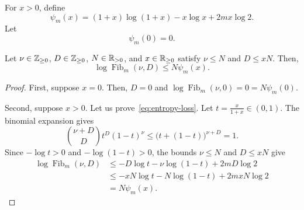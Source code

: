 \begin{definition}\label{def:entropy-loss-function}
For $x>0$, define
\[
 \psi_m(x)=(1+x)\log(1+x)-x\log x+2mx\log2.
\]
Let
\[
 \psi_m(0)=0.
\]
\end{definition}

\begin{lemma}\label{lem:entropy-loss}
Let $\nu\in\mathbb Z_{\ge0}$, $D\in\mathbb Z_{\ge0}$, $N\in\mathbb R_{>0}$, and $x\in\mathbb R_{\ge0}$ satisfy $\nu\le N$ and $D\le xN$.
Then,
\begin{equation}\label{eq:entropy-loss}
 \log \operatorname{Fib}_m(\nu,D)\le N\psi_m(x).
\end{equation}
\end{lemma}
\begin{proof}
First, suppose $x=0$. Then, $D=0$ and $\log \operatorname{Fib}_m(\nu,0)=0=N\psi_m(0)$.

Second, suppose $x>0$. Let us prove~\eqref{eq:entropy-loss}.
Let $t=\frac{x}{1+x}\in(0,1)$.
The binomial expansion gives
\[
 \binom{\nu+D}{D}t^D(1-t)^\nu
 \le\bigl(t+(1-t)\bigr)^{\nu+D}=1.
\]
Since $-\log t>0$ and $-\log(1-t)>0$, the bounds $\nu\le N$ and $D\le xN$ give
\[
\begin{aligned}
 \log \operatorname{Fib}_m(\nu,D)
 &\le-D\log t-\nu\log(1-t)+2mD\log2\\
 &\le-xN\log t-N\log(1-t)+2mxN\log2\\
 &=N\psi_m(x).
\end{aligned}
\]
\end{proof}


